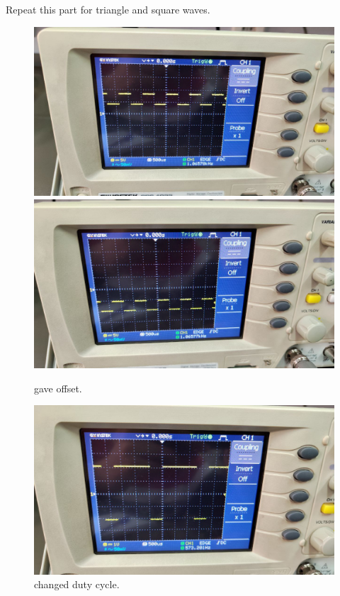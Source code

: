 \documentclass[11pt]{article}
\newcommand{\PicScale}{0.2}
\begin{document}
\begin{question}
\begin{subquestion}{Repeat this part for triangle and square waves.}
{            \begin{figure}[H]
                \begin{center}
                    \includegraphics[scale=0.1]{Fig/16.jpeg}
                    \includegraphics[scale=0.1]{Fig/17.jpeg}
                    \caption{gave offset.}
                \end{center}
            \end{figure}

            \begin{figure}[H]
                \begin{center}
                    \includegraphics[scale=\PicScale]{Fig/18.jpeg}
                    \caption{changed duty cycle.}
                \end{center}
            \end{figure}
        }
    \end{subquestion}

\end{question}
\end{document}
